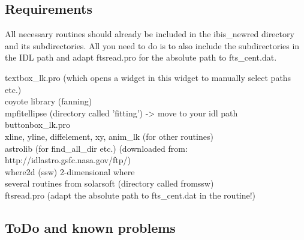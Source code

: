 \documentclass[a4paper,12pt]{article}
\begin{document}
\subsection{Requirements}

All necessary routines should already be included in the ibis\_newred directory and its subdirectories. All you need to do is to also include the subdirectories in the IDL path and adapt ftsread.pro for the absolute path to fts\_cent.dat.

textbox\_lk.pro (which opens a widget in this widget to manually
         select paths etc.) \\
          coyote library (fanning) \\
          mpfitellipse (directory called 'fitting') -> move to your idl path\\
          buttonbox\_lk.pro\\
          xline, yline, diffelement, xy, anim\_lk (for other routines)\\
          astrolib (for find\_all\_dir etc.) 
                       (downloaded from: http://idlastro.gsfc.nasa.gov/ftp/) \\
          where2d (ssw) 2-dimensional where\\
          several routines from solarsoft (directory called fromssw) \\
          ftsread.pro (adapt the absolute path to fts\_cent.dat in the routine!)

\subsection{ToDo and known problems}
\end{document}
